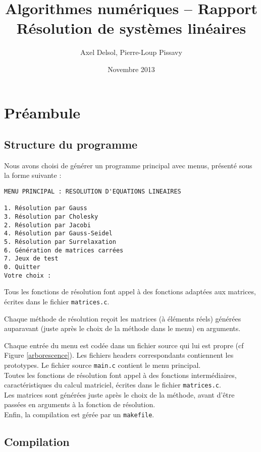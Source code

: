 \documentclass{report}
\title{Algorithmes numériques -- Rapport \\ \vspace{0.5cm}Résolution de systèmes linéaires}
\author{Axel Delsol, Pierre-Loup Pissavy}
\date{Novembre 2013}
\begin{document}
  \maketitle
  \tableofcontents

  \chapter{Préambule}
  	\section{Structure du programme}
    Nous avons choisi de générer un programme principal avec menus, présenté sous la forme suivante :

    \begin{lstlisting}[style=apercu, name=Menu Principal]
MENU PRINCIPAL : RESOLUTION D'EQUATIONS LINEAIRES

1. Résolution par Gauss
3. Résolution par Cholesky
2. Résolution par Jacobi
4. Résolution par Gauss-Seidel
5. Résolution par Surrelaxation
6. Génération de matrices carrées
7. Jeux de test
0. Quitter
Votre choix : 
	\end{lstlisting}
	
	Tous les fonctions de résolution font appel à des fonctions adaptées aux matrices, écrites dans le fichier \verb"matrices.c".
    
    Chaque méthode de résolution reçoit les matrices (à éléments réels) générées auparavant (juste après le choix de la méthode dans le menu) en arguments.
    	
	Chaque entrée du menu est codée dans un fichier source qui lui est propre (cf Figure \ref{arborescence}). Les fichiers headers correspondants contiennent les prototypes. Le fichier source \verb"main.c" contient le menu principal.\\
	
	Toutes les fonctions de résolution font appel à des fonctions intermédiaires, caractéristiques du calcul matriciel, écrites dans le fichier \verb"matrices.c".\\
	
    

    Les matrices sont générées juste après le choix de la méthode, avant d'être passées en arguments à la fonction de résolution.\\

	Enfin, la compilation est gérée par un \verb"makefile".  
	\section{Compilation}
	
\end{document}
